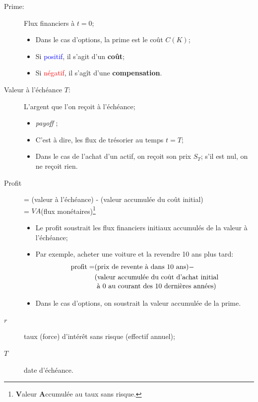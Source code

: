 \documentclass[10pt, french]{article}
\begin{document}
\begin{multicols*}{2}
\begin{distributions}[Terminologie]
\begin{description}
	\item[Prime:] Flux financiers à $t = 0$;
		\begin{itemize}[leftmargin = *]
		\item	Dans le cas d'options, la prime est le coût $C(K)$;
		\item	Si \textcolor{blue}{positif}, il s'agit d'un \textbf{coût};
		\item	Si \textcolor{red}{négatif}, il s'agît d'une \textbf{compensation}.		
		\end{itemize}
	\item[Valeur à l'échéance $T$:]	L'argent que l'on reçoit à l'échéance;
		\begin{itemize}[leftmargin = *]
		\item	\og \textit{payoff} \fg{};
		\item	C'est à dire, les flux de trésorier au temps $t = T$;
		\item	Dans le cas de l'achat d'un actif, on reçoit son prix $S_{T}$; s'il est nul, on ne reçoit rien.
		\end{itemize}
	\item[Profit] 
		= (valeur à l'échéance) - (valeur accumulée du coût initial) \\
		= $VA$(flux monétaires)\footnote{\textbf{V}aleur \textbf{A}ccumulée au taux sans risque.}
		\begin{itemize}[leftmargin = *]
		\item	Le profit soustrait les flux financiers initiaux accumulés de la valeur à l'échéance;
		\item	Par exemple, acheter une voiture et la revendre 10 ans plus tard:
			\begin{align*}
			\text{profit} 
			=	&\text{(prix de revente à dans 10 ans)} -\\ &\text{\shortstack{(valeur accumulée du coût d'achat initial\\ à 0 au courant des 10 dernières années)}}
			\end{align*}
		\item	Dans le cas d'options, on soustrait la valeur accumulée de la prime.
		\end{itemize}
	\tcbline
	\item[$r$] 	taux (force) d'intérêt sans risque (effectif annuel);
	\item[$T$]	date d'échéance.
\end{description}
\end{distributions}


\end{multicols*}
\end{document}
